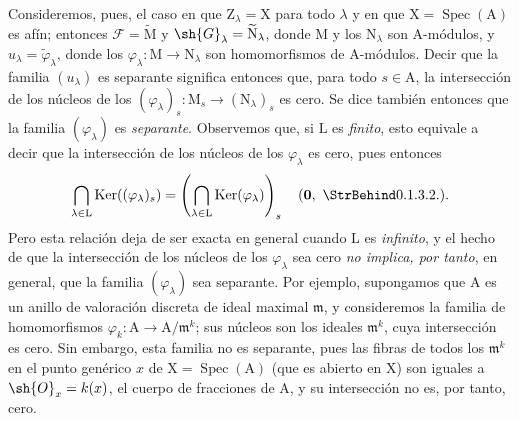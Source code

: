 \begin{env}[11.9.4]
\label{IV.11.9.4}
Consideremos, pues, el caso en que $\mathrm{Z}_\lambda=\mathrm{X}$ para todo $\lambda$ y en que $\mathrm{X}=\operatorname{Spec}(\mathrm{A})$ es afín; entonces $\mathscr{F}=\widetilde{\mathrm{M}}$ y $\sh{G}_\lambda=\widetilde{\mathrm{N}}_\lambda$, donde $\mathrm{M}$ y los $\mathrm{N}_\lambda$ son $\mathrm{A}$-módulos, y $u_\lambda=\widetilde{\varphi}_\lambda$, donde los $\varphi_\lambda:\mathrm{M}\to\mathrm{N}_\lambda$ son homomorfismos de $\mathrm{A}$-módulos.
Decir que la familia $(u_\lambda)$ es separante significa entonces que, para todo $s\in\mathrm{A}$, la intersección de los núcleos de los $(\varphi_\lambda)_s:\mathrm{M}_s\to(\mathrm{N}_\lambda)_s$ es cero.
Se dice también entonces que la familia $(\varphi_\lambda)$ es \emph{separante}.
Observemos que, si $\mathrm{L}$ es \emph{finito}, esto equivale a decir que la intersección de los núcleos de los $\varphi_\lambda$ es cero, pues entonces
\[
  \bigcap_{\lambda\in\mathrm{L}}\operatorname{Ker}((\varphi_\lambda)_s)
  =\left(\bigcap_{\lambda\in\mathrm{L}}\operatorname{Ker}(\varphi_\lambda)\right)_s
  \quad \sref[0]{0.1.3.2}.
\]
Pero esta relación deja de ser exacta en general
cuando $\mathrm{L}$ es \emph{infinito}, y el hecho de que la intersección de los núcleos de los $\varphi_\lambda$ sea cero \emph{no implica, por tanto},
en general, que la familia $(\varphi_\lambda)$ sea separante.
Por ejemplo, supongamos que $\mathrm{A}$ es un anillo de valoración discreta de ideal maximal $\mathfrak{m}$, y consideremos la familia de homomorfismos $\varphi_k:\mathrm{A}\to\mathrm{A}/\mathfrak{m}^k$; sus núcleos son los ideales $\mathfrak{m}^k$, cuya intersección es cero. Sin embargo, esta familia no es separante, pues las fibras de todos los $\mathfrak{m}^k$ en el punto genérico $x$ de $\mathrm{X}=\operatorname{Spec}(\mathrm{A})$ (que es abierto en $\mathrm{X}$) son iguales a $\sh{O}_x=k(x)$, el cuerpo de fracciones de $\mathrm{A}$, y su intersección no es, por tanto, cero.
\end{env}

